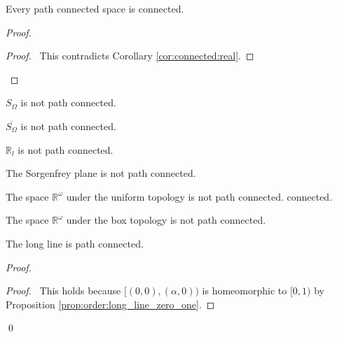 \begin{prop}
  \label{prop:topology:path_connected:connected}
  Every path connected space is connected.
\end{prop}

\begin{proof}
  \pf
  \qedstep
  \begin{proof}
    \pf\ This contradicts Corollary \ref{cor:connected:real}.
  \end{proof}
\end{proof}

\begin{cor}
 $S_\Omega$ is not path connected.
\end{cor}

\begin{cor}
  $\overline{S_\Omega}$ is not path connected.
\end{cor}

\begin{cor}
  $\mathbb{R}_l$ is not path connected.
\end{cor}

\begin{cor}
 The Sorgenfrey plane is not path connected.
\end{cor}

\begin{cor}
 The space $\mathbb{R}^\omega$ under the uniform topology is not path connected.
connected.
\end{cor}

\begin{cor}
 The space $\mathbb{R}^\omega$ under the box topology is not path connected.
\end{cor}

\begin{prop}
  The long line is path connected.
\end{prop}

\begin{proof}
  \pf
  \begin{proof}
    \pf\ This holds because $[(0, 0), (\alpha, 0))$ is homeomorphic to $[0,
    1)$ by Proposition \ref{prop:order:long_line_zero_one}.
  \end{proof}
  \qed
\end{proof}

